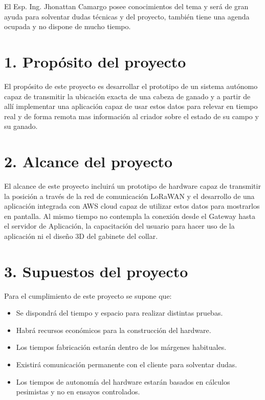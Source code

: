 \documentclass[11pt]{charter}
\begin{document}
El Esp. Ing. Jhonattan Camargo posee conocimientos del tema y será de gran ayuda para solventar dudas técnicas y del proyecto, también tiene una agenda ocupada y no dispone de mucho tiempo.



\section{1. Propósito del proyecto}
\label{sec:proposito}

El propósito de este proyecto es desarrollar el prototipo de un sistema autónomo capaz de transmitir la ubicación exacta de una cabeza de ganado y a partir de allí implementar una aplicación capaz de usar estos datos para relevar en tiempo real y de forma remota mas información al criador sobre el estado de su campo y su ganado. 

\section{2. Alcance del proyecto}
\label{sec:alcance}

El alcance de este proyecto incluirá un prototipo de hardware capaz de transmitir la posición a través de la red de comunicación LoRaWAN y el desarrollo de una aplicación integrada con AWS cloud capaz de utilizar estos datos para mostrarlos en pantalla. Al mismo tiempo no contempla la conexión desde el Gateway hasta el servidor de Aplicación, la capacitación del usuario para hacer uso de la aplicación ni el diseño 3D del gabinete del collar. 


\section{3. Supuestos del proyecto}
\label{sec:supuestos}

Para el cumplimiento de este proyecto se supone que: 

\begin{itemize}
\item Se dispondrá del tiempo y espacio para realizar distintas pruebas.
\item Habrá recursos económicos para la construcción del hardware.
\item Los tiempos fabricación estarán dentro de los márgenes habituales.
\item Existirá comunicación permanente con el cliente para solventar dudas.
\item Los tiempos de autonomía del hardware estarán basados en cálculos pesimistas y no en ensayos controlados.
\end{itemize}
\end{document}
